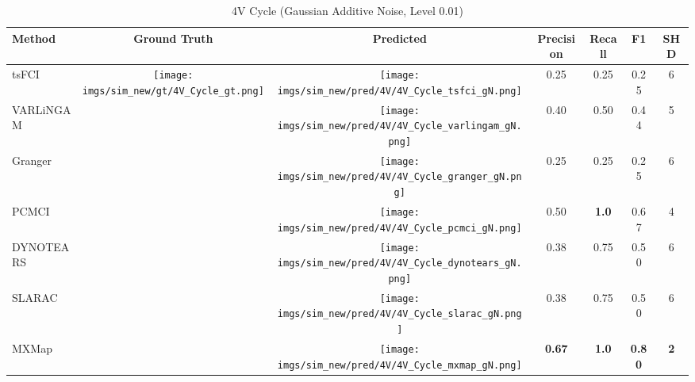 \begin{table}[htb]
\begin{tabular}{l|c|c|c|c|c|c}
Method    & Ground Truth      & Predicted & Precision     & Recall       & F1            & SHD        \\ \hline
tsFCI     & \multirow{7}{*}[-4.6em]{\begin{minipage}{.17\linewidth} \centering \texttt{[image: imgs/sim\_new/gt/4V\_Cycle\_gt.png]} \end{minipage}} & \begin{minipage}{.17\linewidth} \centering \texttt{[image: imgs/sim\_new/pred/4V/4V\_Cycle\_tsfci\_gN.png]} \end{minipage}   & 0.25          & 0.25         & 0.25          & 6          \\
VARLiNGAM &                   & \begin{minipage}{.17\linewidth} \centering \texttt{[image: imgs/sim\_new/pred/4V/4V\_Cycle\_varlingam\_gN.png]} \end{minipage}   & 0.40          & 0.50         & 0.44          & 5          \\
Granger   &                   &  \begin{minipage}{.17\linewidth} \centering \texttt{[image: imgs/sim\_new/pred/4V/4V\_Cycle\_granger\_gN.png]} \end{minipage}  & 0.25          & 0.25         & 0.25          & 6          \\
PCMCI     &                   & \begin{minipage}{.17\linewidth} \centering \texttt{[image: imgs/sim\_new/pred/4V/4V\_Cycle\_pcmci\_gN.png]} \end{minipage}   & 0.50          & \textbf{1.0} & 0.67          & 4          \\
DYNOTEARS &                   & \begin{minipage}{.17\linewidth} \centering \texttt{[image: imgs/sim\_new/pred/4V/4V\_Cycle\_dynotears\_gN.png]} \end{minipage}    & 0.38          & 0.75         & 0.50          & 6          \\
SLARAC    &                   &   \begin{minipage}{.17\linewidth} \centering \texttt{[image: imgs/sim\_new/pred/4V/4V\_Cycle\_slarac\_gN.png]} \end{minipage}    & 0.38          & 0.75         & 0.50          & 6          \\ \cline{1-1} \cline{3-7} 
MXMap     &                   & \begin{minipage}{.17\linewidth} \centering \texttt{[image: imgs/sim\_new/pred/4V/4V\_Cycle\_mxmap\_gN.png]} \end{minipage}    & \textbf{0.67} & \textbf{1.0} & \textbf{0.80} & \textbf{2}
\end{tabular}
\caption{4V Cycle (Gaussian Additive Noise, Level 0.01)}
\label{tab:4V_Cycle_gN}
\end{table}


